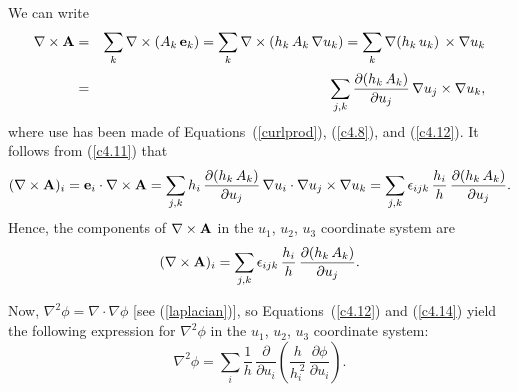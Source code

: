 We can write
\begin{eqnarray}
\nabla\times {\bf A} &=& \sum_k\nabla\times (A_k\,{\bf e}_k)=\sum_k \nabla\times (h_k\,A_k\,\nabla u_k)
=\sum_k\nabla (h_k\,u_k)\,\times \nabla u_k\nonumber\\[0.5ex]
&=&\sum_{j,k}\frac{\partial (h_k\,A_k)}{\partial u_j}\,\nabla u_j\times\nabla u_k,
\end{eqnarray}
where use has been made of Equations~(\ref{curlprod}), (\ref{c4.8}), and (\ref{c4.12}).
It follows from (\ref{c4.11}) that
\begin{equation}
(\nabla\times {\bf A})_i = {\bf e}_i\cdot\nabla\times {\bf A} = \sum_{j,k}h_i\,\frac{\partial (h_k\,A_k)}{\partial u_j}\,\nabla u_i\cdot\nabla u_j\times \nabla u_k = \sum_{j,k}\epsilon_{ijk}\,\frac{h_i}{h}\,\frac{\partial (h_k\,A_k)}{\partial u_j}.
\end{equation}
 Hence, the components of $\nabla\times {\bf A}$ in the
$u_1$, $u_2$, $u_3$ coordinate system are
\begin{equation}\label{c4.17}
(\nabla\times{\bf A})_i =  \sum_{j,k}\epsilon_{ijk}\,\frac{h_i}{h}\,\frac{\partial (h_k\,A_k)}{\partial u_j}.
\end{equation}

Now, $\nabla^2\phi = \nabla\cdot\nabla\phi$ [see (\ref{laplacian})], so Equations~(\ref{c4.12}) and (\ref{c4.14})
yield the following expression for $\nabla^2\phi$ in the $u_1$, $u_2$, $u_3$ coordinate system:
\begin{equation}\label{c4.19}
\nabla^2\phi =\sum_i\frac{1}{h}\,\frac{\partial}{\partial u_i}\!\left(\frac{h}{h_i^{\,2}}\,\frac{\partial\phi}{\partial u_i}\right).
\end{equation}

